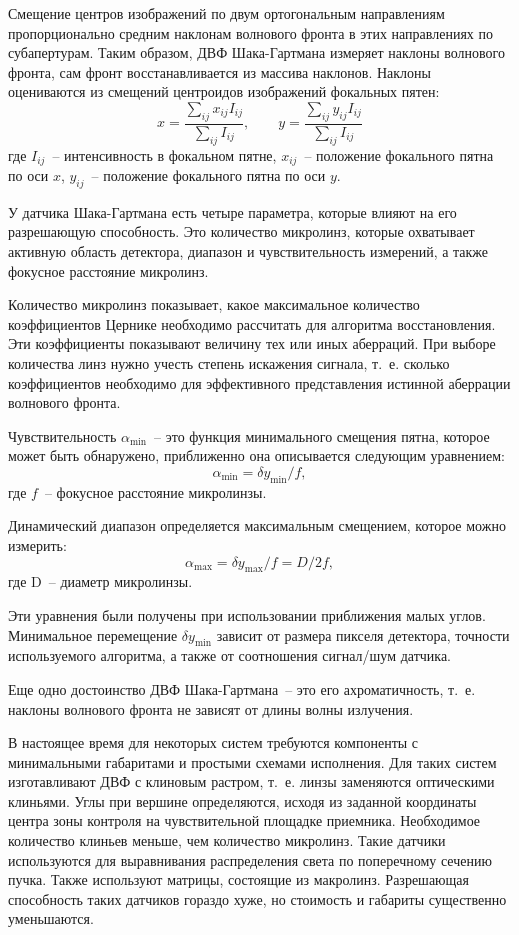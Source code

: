\documentclass[pscyr]{hedwork}
\begin{document}
Смещение центров изображений по двум ортогональным направлениям пропорционально
средним наклонам волнового фронта в этих направлениях по субапертурам. Таким
образом, ДВФ Шака-Гартмана измеряет наклоны волнового фронта, сам фронт
восстанавливается из массива наклонов. Наклоны оцениваются из смещений
центроидов изображений фокальных пятен:
\[
  x = \frac{\sum\limits_{ij} x_{ij} I_{ij}}{\sum\limits_{ij} I_{ij}}, \qquad
    y = \frac{\sum\limits_{ij} y_{ij} I_{ij}}{\sum\limits_{ij} I_{ij}}
\]
где \( I_{ij} \)~-- интенсивность в фокальном пятне, \( x_{ij} \)~-- положение
фокального пятна по оси \( x \), \( y_{ij} \)~-- положение фокального пятна по
оси \( y \).

У датчика Шака-Гартмана есть четыре параметра, которые влияют на его разрешающую
способность. Это количество микролинз, которые охватывает активную область
детектора, диапазон и чувствительность измерений, а также фокусное расстояние
микролинз.
 
Количество микролинз показывает, какое максимальное количество коэффициентов
Цернике необходимо рассчитать для алгоритма восстановления. Эти коэффициенты
показывают величину тех или иных аберраций. При выборе количества линз нужно
учесть степень искажения сигнала, т.~е. сколько коэффициентов необходимо для
эффективного представления истинной аберрации волнового фронта.

Чувствительность \( \alpha_{\min} \)~-- это функция минимального смещения пятна,
которое может быть обнаружено, приближенно она описывается следующим уравнением:
\[
  \alpha_{\min} = \delta y_{\min} / f,
\]
где \( f \)~-- фокусное расстояние микролинзы.
 
Динамический диапазон определяется максимальным смещением, которое можно
измерить:
\[
  \alpha_{\max} = \delta y_{\max} / f = D / 2f,
\]
где D~-- диаметр микролинзы.

Эти уравнения были получены при использовании приближения малых углов.
Минимальное перемещение \( \delta y_{\min} \) зависит от размера пикселя
детектора, точности используемого алгоритма, а также от соотношения сигнал/шум
датчика.
 
Еще одно достоинство ДВФ Шака-Гартмана~-- это его ахроматичность, т.~е. наклоны
волнового фронта не зависят от длины волны излучения.

В настоящее время для некоторых систем требуются компоненты с минимальными
габаритами и простыми схемами исполнения. Для таких систем изготавливают ДВФ с
клиновым растром, т.~е. линзы заменяются оптическими клиньями. Углы при вершине
определяются, исходя из заданной координаты центра зоны контроля на
чувствительной площадке приемника. Необходимое количество клиньев меньше, чем
количество микролинз. Такие датчики используются для выравнивания распределения
света по поперечному сечению пучка. Также используют матрицы, состоящие из
макролинз. Разрешающая способность таких датчиков гораздо хуже, но стоимость и
габариты существенно уменьшаются.
\end{document}
